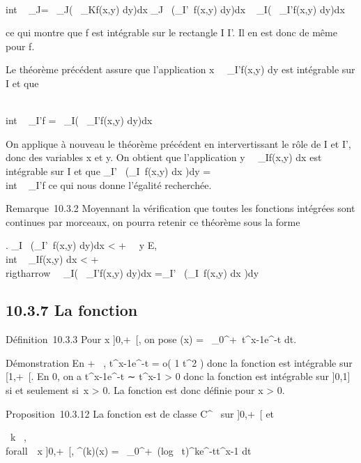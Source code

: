 \documentclass[]{article}
\begin{document}
\int  \\int ~
_J\timesKf =\int ~
_J\left (\int ~
_Kf(x,y) dy\right )dx
\leq\int  _J~\left
(\int  _I'~f(x,y)
dy\right )dx \leq\int ~
_I\left (\int ~
_I'f(x,y) dy\right )dx

ce qui montre que f est intégrable sur le rectangle
I \times I'. Il en est donc de même pour f.

Le théorème précédent assure que l'application
x\mapsto~\int ~
_I'f(x,y) dy est intégrable sur I et que

\int  \\int ~
_I\timesI'f =\int ~
_I\left (\int ~
_I'f(x,y) dy\right )dx

On applique à nouveau le théorème précédent en intervertissant le rôle
de I et I', donc des variables x et y. On obtient que l'application
y\mapsto~\int ~
_If(x,y) dx est intégrable sur I et que
\int  _I'~\left
(\int  _I~f(x,y) dx\right
)dy =\int  \\int ~
_I\timesI'f ce qui nous donne l'égalité recherchée.

Remarque~10.3.2 Moyennant la vérification que toutes les fonctions
intégrées sont continues par morceaux, on pourra retenir ce théorème
sous la forme

\left .\array
\int  _I~\left
(\int  _I'~f(x,y)
dy\right )dx < +\infty~ \cr
\forall~y \in E, \\int ~
_If(x,y) dx < +\infty~ 
\right \\rigtharrow~\int ~
_I\left (\int ~
_I'f(x,y) dy\right )dx
=\int  _I'~\left
(\int  _I~f(x,y) dx\right
)dy

\subsection{10.3.7 La fonction \Gamma}

Définition~10.3.3 Pour x \in]0,+\infty~[, on pose \Gamma(x)
=\int ~
_0^+\infty~t^x-1e^-t dt.

Démonstration En + \infty~, t^x-1e^-t = o( 1
\over t^2 ) donc la fonction est intégrable
sur [1,+\infty~[. En 0, on a t^x-1e^-t ∼
t^x-1 > 0 donc la fonction est intégrable sur
]0,1] si et seulement si~x > 0. La fonction \Gamma est donc
définie pour x > 0.

Proposition~10.3.12 La fonction \Gamma est de classe C^\infty~ sur
]0,+\infty~[ et

\forall~k \in {}~, \\forall~~x
\in]0,+\infty~[, \Gamma^(k)(x) =\int ~
_0^+\infty~(log~
t)^ke^-tt^x-1 dt
\end{document}
